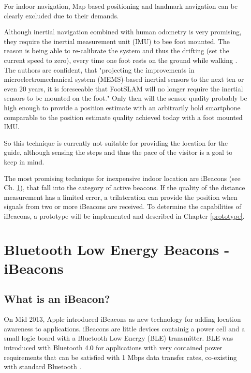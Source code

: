 For indoor navigation, Map-based positioning and landmark navigation can be clearly excluded due to their demands.

Although inertial navigation combined with human odometry is very promising, they require the inertial measurement unit (IMU) to bee foot mounted. The reason is being able to re-calibrate the system and thus the drifting (set the current speed to zero), every time one foot rests on the ground while walking \cite{footslam}. The authors are confident, that "projecting the improvements in microelectromechanical system (MEMS)-based inertial sensors to the next ten or even 20 years, it is foreseeable that FootSLAM will no longer require the inertial sensors to be mounted on the foot." Only then will the sensor quality probably be high enough to provide a position estimate with an arbitrarily hold smartphone comparable to the position estimate quality achieved today with a foot mounted IMU. 

So this technique is currently not suitable for providing the location for the guide, although sensing the steps and thus the pace of the visitor is a goal to keep in mind.

The most promising technique for inexpensive indoor location are iBeacons (see Ch. \ref{ibeacons}), that fall into the category of active beacons. If the quality of the distance measurement has a limited error, a trilateration can provide the position when signals from two or more iBeacons are received. To determine the capabilities of iBeacons, a prototype will be implemented and described in Chapter \ref{prototype}.
 


\section{Bluetooth Low Energy Beacons - iBeacons}

\label{ibeacons}

\subsection{What is an iBeacon?}

On Mid 2013, Apple introduced iBeacons as new technology for adding location awareness to applications. iBeacons are little devices containig a power cell and a small logic board with a Bluetooth Low Energy (BLE) transmitter. BLE was introduced with Bluetooth 4.0 for applications with very contained power requirements that can be satisfied with 1 Mbps data transfer rates, co-existing with standard Bluetooth \cite{ble}.

